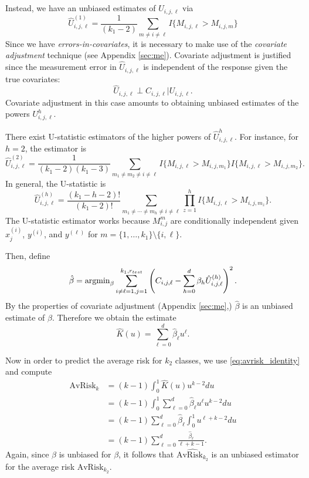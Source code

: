 \documentclass[12pt]{article}
\begin{document}
Instead, we have an unbiased estimates of $\hat{U}_{i, j, \ell}$ via
\[
\hat{U}_{i,j, \ell}^{(1)} = \frac{1}{(k_1-2)}\sum_{m \neq i \neq \ell} I\{M_{i, j, \ell} > M_{i, j, m}\}
\]
Since we have \emph{errors-in-covariates}, it is necessary to make use
of the \emph{covariate adjustment} technique (see
Appendix \ref{sec:me}).  Covariate adjustment is justified since the
measurement error in $\hat{U}_{i,j, \ell}$ is independent of the
response given the true covariates:
\[
\hat{U}_{i,j,\ell} \perp C_{i,j,\ell} | U_{i, j,\ell}.
\]
Covariate adjustment in this case amounts to obtaining unbiased estimates of
the powers $U_{i,j,\ell}^h$.

There exist U-statistic estimators of the higher powers of
$\hat{U}_{i,j,\ell}^h$.  For instance, for $h=2$, the estimator is
\[
\hat{U}_{i,j,\ell}^{(2)} = \frac{1}{ (k_1-2)(k_1-3) } \sum_{m_1\neq m_2 \neq i \neq \ell} I\{M_{i, j, \ell} > M_{i, j, m_1}\} I\{M_{i, j, \ell} > M_{i, j, m_2}\}.
\]
In general, the U-statistic is
\[
\hat{U}_{i, j, \ell}^{(h)} = \frac{(k_1-h-2)!}{(k_1-2)!} \sum_{m_1 \neq \cdots \neq m_h \neq i \neq \ell} \prod_{z=1}^h I\{M_{i, j, \ell} > M_{i, j, m_z}\}.
\]
The U-statistic estimator works because $M_{i, j}^m$ are conditionally
independent given $x^{(i)}_j$, $y^{(i)}$, and $y^{(\ell)}$ for $m
= \{1,\hdots, k_1\}\setminus \{i, \ell\}$.

Then, define
\[
\hat{\beta} = \text{argmin}_\beta \sum_{i\neq \ell=1, j = 1}^{k_1, r_{test}} \left(C_{i,j,\ell} - \sum_{h=0}^d \beta_h \hat{U}_{i,j, \ell}^{(h)}\right)^2.
\]
By the properties of covariate adjustment (Appendix \ref{sec:me},) $\hat{\beta}$ is an unbiased estimate of $\beta$.
Therefore we obtain the estimate
\[
\hat{K}(u) = \sum_{\ell = 0}^d \hat{\beta}_\ell u^\ell.
\]

Now in order to predict the average risk for $k_2$ classes, we use \eqref{eq:avrisk_identity} and compute
\begin{align*}
\widehat{\text{AvRisk}_k} &= (k-1) \int_0^1 \hat{K}(u) u^{k-2} du
\\&= (k-1) \int_0^1 \sum_{\ell = 0}^d \hat{\beta}_\ell u^\ell u^{k-2} du
\\&= (k-1) \sum_{\ell = 0}^d \hat{\beta}_\ell  \int_0^1 u^{\ell + k-2} du
\\&= (k-1) \sum_{\ell = 0}^d \frac{\hat{\beta}_\ell}{\ell + k - 1}.
\end{align*}
Again, since $\hat{\beta}$ is unbiased for $\beta$, it follows that
$\widehat{\text{AvRisk}_{k_2}}$ is an unbiased estimator for the
average risk $\text{AvRisk}_{k_2}$.
\end{document}
